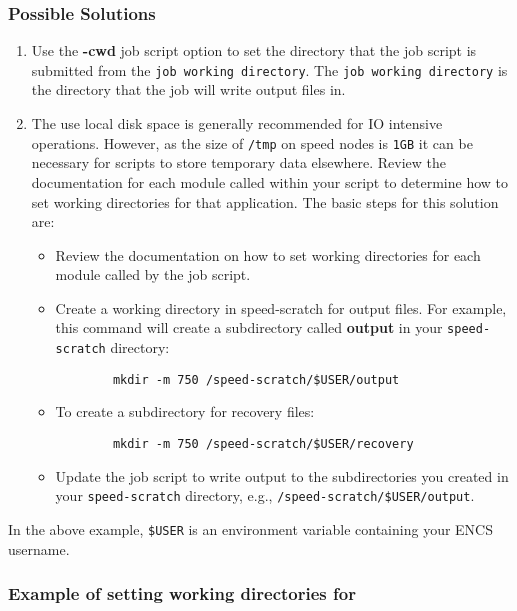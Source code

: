 \documentclass{easychair}
\begin{document}
\subsubsection{Possible Solutions}

\begin{enumerate}
	\item
Use the \textbf{-cwd} job script option to set the directory that the job script
 is submitted from the \texttt{job working directory}. The \texttt{job working directory} is the directory that the job will write output files in.
	\item
The use local disk space is generally recommended for IO intensive operations. However, as the size of \texttt{/tmp} on speed nodes 
is \texttt{1GB} it can be necessary for scripts to store temporary data 
elsewhere. 
Review the documentation for each module called within your script to 
determine how to set working directories for that application. 
The basic steps for this solution are:
\begin{itemize}
	\item
	Review the documentation on how to set working directories for 
	each module called by the job script.
	\item
	Create a working directory in speed-scratch for output files. 
	For example, this command will create a subdirectory called \textbf{output}
	 in your \verb!speed-scratch! directory:
	 \begin{verbatim}
		mkdir -m 750 /speed-scratch/$USER/output
	 \end{verbatim}
	\item
	To create a subdirectory for recovery files:
	\begin{verbatim}
		mkdir -m 750 /speed-scratch/$USER/recovery
	\end{verbatim}
	\item
	Update the job script to write output to the subdirectories you created in your \verb!speed-scratch! directory, e.g., \verb!/speed-scratch/$USER/output!.
	\end{itemize}
\end{enumerate}
In the above example, \verb!$USER! is an environment variable containing your ENCS username.
\subsubsection{Example of setting working directories for }
\end{document}
